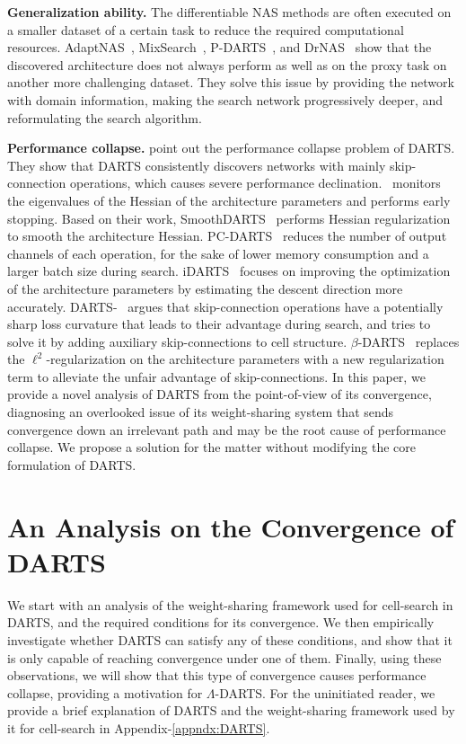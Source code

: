 \documentclass{article} \usepackage{fancyhdr, iclr2023_conference, times}
\newcommand{\mydarts}{$\Lambda$-DARTS\xspace}
\begin{document}
\textbf{Generalization ability.} The differentiable NAS methods are often executed on a smaller dataset of a certain task to reduce the required computational resources. AdaptNAS~\citep{DBLP:conf/nips/LiYW020}, MixSearch~\citep{DBLP:journals/corr/abs-2102-13280}, P-DARTS~\citep{DBLP:journals/ijcv/ChenXWT21}, and DrNAS~\citep{DBLP:conf/iclr/ChenWCTH21} show that the discovered architecture does not always perform as well as on the proxy task on another more challenging dataset. They solve this issue by providing the network with domain information, making the search network progressively deeper, and reformulating the search algorithm.
\par \textbf{Performance collapse.} \citet{DBLP:conf/iclr/ZelaESMBH20,DBLP:conf/iclr/ChuW0LWY21} point out the performance collapse problem of DARTS. They show that DARTS consistently discovers networks with mainly skip-connection operations, which causes severe performance declination.~\citet{DBLP:conf/iclr/ZelaESMBH20} monitors the eigenvalues of the Hessian of the architecture parameters and performs early stopping. Based on their work, SmoothDARTS~\citep{DBLP:conf/icml/ChenH20} performs Hessian regularization to smooth the architecture Hessian. PC-DARTS~\citep{DBLP:conf/iclr/XuX0CQ0X20} reduces the number of output channels of each operation, for the sake of lower memory consumption and a larger batch size during search. iDARTS~\citep{DBLP:conf/icml/ZhangSPCAH21} focuses on improving the optimization of the architecture parameters by estimating the descent direction more accurately. DARTS-~\citep{DBLP:conf/iclr/ChuW0LWY21} argues that skip-connection operations have a potentially sharp loss curvature that leads to their advantage during search, and tries to solve it by adding auxiliary skip-connections to cell structure. $\beta$-DARTS~\citep{DBLP:journals/corr/abs-2203-01665} replaces the $\ell^2$-regularization on the architecture parameters with a new regularization term to alleviate the unfair advantage of skip-connections. 
In this paper, we provide a novel analysis of DARTS from the point-of-view of its convergence, diagnosing an overlooked issue of its weight-sharing system that sends convergence down an irrelevant path and may be the root cause of performance collapse. We propose a solution for the matter without modifying the core formulation of DARTS.

\section{An Analysis on the Convergence of DARTS}
We start with an analysis of the weight-sharing framework used for cell-search in DARTS, and the required conditions for its convergence. We then empirically investigate whether DARTS can satisfy any of these conditions, and show that it is only capable of reaching convergence under one of them. Finally, using these observations, we will show that this type of convergence causes performance collapse, providing a motivation for \mydarts. For the uninitiated reader, we provide a brief explanation of DARTS and the weight-sharing framework used by it for cell-search in Appendix-\ref{appndx:DARTS}.
\end{document}
